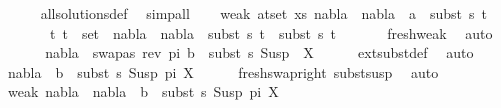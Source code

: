 \begin{isabellebody}
\ \ \ \ \isamarkupfalse%
\ all{\isacharunderscore}{\kern0pt}solutions{\isacharunderscore}{\kern0pt}def\ \isamarkupfalse%
\ simp{\isacharunderscore}{\kern0pt}all\isanewline
\ \ \isamarkupfalse%
\ weak{}{\isacharcolon}{\kern0pt}\ {\isachardoublequoteopen}{\isasymforall}{\isacharparenleft}{\kern0pt}a{\isacharcomma}{\kern0pt}t{\isacharparenright}{\kern0pt}{\isasymin}set\ xs{\isachardot}{\kern0pt}\ {\isacharparenleft}{\kern0pt}nabla{}\ {\isasymunion}\ nabla{}{\isacharparenright}{\kern0pt}\ {\isasymturnstile}\ a\ {\isasymsharp}\ subst\ s{}\ t{\isachardoublequoteclose}\isanewline
\ \ \ \ \ \ {\isachardoublequoteopen}{\isasymforall}\ {\isacharparenleft}{\kern0pt}t{}{\isacharcomma}{\kern0pt}\ t{}{\isacharparenright}{\kern0pt}\ {\isasymin}\ set\ {\isacharbrackleft}{\kern0pt}{\isacharbrackright}{\kern0pt}{\isachardot}{\kern0pt}\ {\isacharparenleft}{\kern0pt}nabla{}\ {\isasymunion}\ nabla{}{\isacharparenright}{\kern0pt}\ {\isasymturnstile}\ subst\ s{}\ t{}\ {\isasymapprox}\ subst\ s{}\ t{}{\isachardoublequoteclose}\isanewline
\ \ \ \ \ \isamarkupfalse%
\ fresh{\isacharunderscore}{\kern0pt}weak\ \isamarkupfalse%
\ auto\isanewline
\ \ \isamarkupfalse%
\ {}\ \isamarkupfalse%
\ {\isachardoublequoteopen}nabla{}\ {\isasymturnstile}\ swapas\ {\isacharparenleft}{\kern0pt}rev\ pi{\isacharparenright}{\kern0pt}\ b\ {\isasymsharp}\ subst\ s{}\ {\isacharparenleft}{\kern0pt}Susp\ {\isacharbrackleft}{\kern0pt}{\isacharbrackright}{\kern0pt}\ X{\isacharparenright}{\kern0pt}{\isachardoublequoteclose}\isanewline
\ \ \ \ \isamarkupfalse%
\ ext{\isacharunderscore}{\kern0pt}subst{\isacharunderscore}{\kern0pt}def\ \isamarkupfalse%
\ auto\isanewline
\ \ \isamarkupfalse%
\ {\isachardoublequoteopen}nabla{}\ {\isasymturnstile}\ b\ {\isasymsharp}\ subst\ s{}\ {\isacharparenleft}{\kern0pt}Susp\ pi\ X{\isacharparenright}{\kern0pt}{\isachardoublequoteclose}\isanewline
\ \ \ \ \isamarkupfalse%
\ fresh{\isacharunderscore}{\kern0pt}swap{\isacharunderscore}{\kern0pt}right\ subst{\isacharunderscore}{\kern0pt}susp\ \isamarkupfalse%
\ auto\isanewline
\ \ \isamarkupfalse%
\ weak{}{\isacharcolon}{\kern0pt}\ {\isachardoublequoteopen}{\isacharparenleft}{\kern0pt}nabla{}\ {\isasymunion}\ nabla{}{\isacharparenright}{\kern0pt}\ {\isasymturnstile}\ b\ {\isasymsharp}\ subst\ s{}\ {\isacharparenleft}{\kern0pt}Susp\ pi\ X{\isacharparenright}{\kern0pt}{\isachardoublequoteclose}\isanewline

\end{isabellebody}

